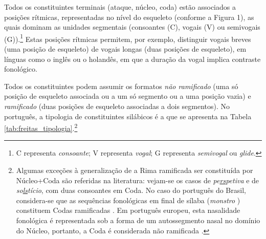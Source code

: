 \documentclass[output=paper]{LSP/langsci}
\begin{document}
Todos os constituintes terminais (ataque, núcleo, coda) estão associados a posições rítmicas, representadas no nível do esqueleto (conforme a Figura 1), as quais dominam as unidades segmentais (consoantes (C), vogais (V) ou semivogais (G)).\footnote{C representa \textit{consoante}; V representa \textit{vogal}; G representa \textit{semivogal} ou \textit{glide}.} Estas posições rítmicas permitem, por exemplo, distinguir vogais breves (uma posição de esqueleto) de vogais longas (duas posições de esqueleto), em línguas como o inglês ou o holandês, em que a duração da vogal implica contraste fonológico.

Todos os constituintes podem assumir os formatos \textit{não ramificado} (uma só posição de esqueleto associada ou a um só segmento ou a uma posição vazia) e \textit{ramificado} (duas posições de esqueleto associadas a dois segmentos). No português, a tipologia de constituintes silábicos é a que se apresenta na Tabela \ref{tab:freitas_tipologia}.\footnote{Algumas exceções à generalização de a Rima ramificada ser constituída por Núcleo+Coda são referidas na literatura: vejam-se os casos de \textit{pe\underline{rs}petiva} e de \textit{so\underline{ls}tício}, com duas consoantes em Coda. No caso do português do Brasil, considera-se que as sequências fonológicas  em final de sílaba (\textit{monstro} \textipa{[‘m\~oStRu]}) constituem Codas ramificadas \citep{bisol2005}. Em português europeu, esta nasalidade fonológica é representada sob a forma de um autossegmento nasal no domínio do Núcleo, portanto, a Coda é considerada não ramificada \citep{mateusdandrade2000,mateus_etal2005}.}
\end{document}

